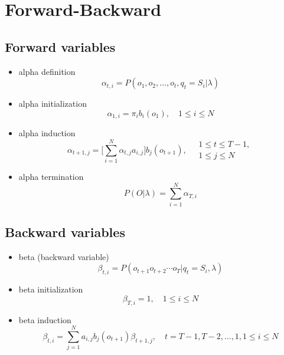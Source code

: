 \documentclass[10pt]{article}
\begin{document}
\section{Forward-Backward}
\label{sec:fb}

\subsection{Forward variables}
\label{sec:forward}
\begin{itemize}
\item alpha definition
  \begin{equation}
    \label{eq:alpha}
    \alpha_{t,i}=P(o_1,o_2,\ldots,o_t, q_t = S_i \vert \lambda)
  \end{equation}
\item alpha initialization
  \begin{equation}
    \label{eq:alpha_init}
    \alpha_{1,i}=\pi_ib_i(o_1), \quad 1 \le i \le N
  \end{equation}
\item alpha induction
  \begin{equation}
    \label{eq:alpha_induct}
    \alpha_{t+1,j}=\Big[ \displaystyle\sum_{i=1}^{N}\alpha_{t,j}a_{i,j}\Big] b_{j}(o_{t+1}), \quad \substack{1 \le t \le T-1, \\ 1 \le j \le N}
  \end{equation}
\item alpha termination
  \begin{equation}
    \label{eq:alpha_term}
    P(O|\lambda) = \displaystyle\sum_{i=1}^{N}\alpha_{T,i}
  \end{equation}
\end{itemize}
\subsection{Backward variables}
\label{sec:back}

\begin{itemize}
\item beta (backward variable)
  \begin{equation}
    \label{eq:beta}
    \beta_{t,i}=P(o_{t+1} o_{t+2} \cdots o_{T} \vert q_t = S_i, \lambda)
  \end{equation}
\item beta initialization
  \begin{equation}
    \label{eq:beta_init}
    \beta_{T,i}=1,\quad 1 \le i \le N
  \end{equation}
\item beta induction
  \begin{equation}
    \label{eq:beta_ind}
    \beta_{t,i}=\displaystyle\sum_{j=1}^{N}a_{i,j}b_j(o_{t+1})\beta_{t+1,j},
    \quad t = T-1, T-2, \ldots , 1, 1 \le i \le N
  \end{equation}
\end{itemize}
\end{document}
